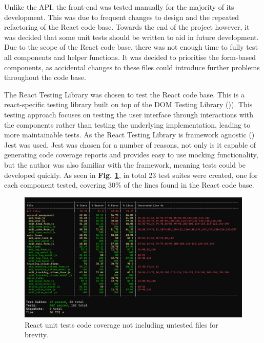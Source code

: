 \documentclass[l4proj.tex]{subfiles}
\begin{document}
Unlike the API, the front-end was tested manually for the majority of its development. This was due to frequent changes to design and the repeated refactoring of the React code base. Towards the end of the project however, it was decided that some unit tests should be written to aid in future development. Due to the scope of the React code base, there was not enough time to fully test all components and helper functions. It was decided to prioritise the form-based components, as accidental changes to these files could introduce further problems throughout the code base.

The React Testing Library was chosen to test the React code base. This is a react-specific testing library built on top of the DOM Testing Library (\cite{ReactTestingLibrary})). This testing approach focuses on testing the user interface through interactions with the components rather than testing the underlying implementation, leading to more maintainable tests. As the React Testing Library is framework agnostic (\cite{ReactTestingLibrary}) Jest was used. Jest was chosen for a number of reasons, not only is it capable of generating code coverage reports and provides easy to use mocking functionality, but the author was also familiar with the framework, meaning tests could be developed quickly. As seen in  \textbf{Fig. \ref{fig:react unit tests}}, in total 23 test suites were created, one for each component tested, covering $30\%$ of the lines found in the React code base.

\begin{figure}[h!]
\begin{center}
\includegraphics[scale=0.4]{dissertation/images/ReactUnitTests.png}
\caption{React unit tests code coverage not including untested files for brevity.}
\label{fig:react unit tests} 
\end{center}
\end{figure}
\end{document}
